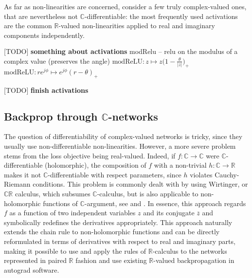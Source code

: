 \documentclass[a4paper,10pt]{article}
\newcommand{\important}[1]{\textbf{\color{red} #1}}
\newcommand{\todo}[1]{{\color{blue} [TODO]} \important{#1}}
\newcommand{\real}{\mathbb{R}}
\newcommand{\cplx}{\mathbb{C}}
\newcommand{\conj}[1]{\overline{#1}}
\begin{document}
As far as non-linearities are concerned, \cite{trabelsi_deep_2017} consider a few truly
complex-valued ones, that are nevertheless not $\cplx$-differentiable: the most frequently
used activations are the common $\real$-valued non-linearities applied to real and
imaginary components independently.

\todo{something about activations}
modRelu -- relu on the modulus of a complex value (preserves the angle)
$
\mathrm{modReLU}
  \colon z \mapsto z \bigl(
    1 - \tfrac\theta{\lvert z \rvert}
  \bigr)_+
$
$
\mathrm{modReLU}
  \colon r e^{j \phi} \mapsto e^{j \phi} (r - \theta)_+
$

\todo{finish activations}

\subsection{Backprop through $\cplx$-networks} %
\label{sub:backprop_through_c_networks}

The question of differentiability of complex-valued networks is tricky, since they usually
use non-differentiable non-linearities. However, a more severe problem stems from the loss
objective being real-valued. Indeed, if $f\colon \cplx \to \cplx$ were $\cplx$-differentiable
(holomorphic), the composition of $f$ with a non-trivial $h \colon \cplx\to \real$ makes it
not $\cplx$-differentiable with respect parameters, since $h$ violates Cauchy-Riemann conditions.
This problem is commonly dealt with by using Wirtinger, or $\cplx\real$ calculus, which subsumes
$\cplx$-calculus, but is also applicable to non-holomorphic functions of $\cplx$-argument, see
\cite{adali_complex-valued_2011} and \cite{trabelsi_deep_2017}. In essence, this approach
regards $f$ as a function of two independent variables $z$ and its conjugate $\conj{z}$ and
symbolically redefines the derivatives appropriately. This approach naturally extends the
chain rule to non-holomorphic functions and can be directly reformulated in terms of derivatives
with respect to real and imaginary parts, making it possible to use and apply the rules of
$\real$-calculus to the networks represented in paired $\real$ fashion and use existing
$\real$-valued backpropagation in autograd software.
\end{document}
